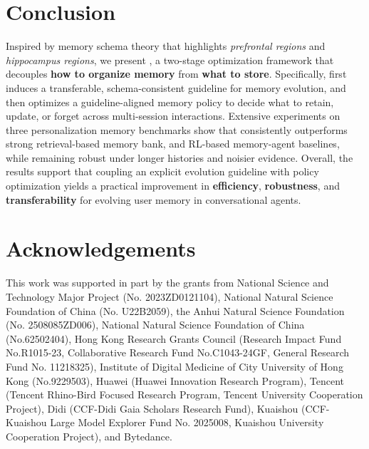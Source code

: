 \section{Conclusion}

Inspired by memory schema theory that highlights \emph{prefrontal regions} and \emph{hippocampus regions}, we present \ourmodel, a two-stage optimization framework that decouples \textbf{how to organize memory} from \textbf{what to store}. Specifically, \ourmodel first induces a transferable, schema-consistent guideline for memory evolution, and then optimizes a guideline-aligned memory policy to decide what to retain, update, or forget across multi-session interactions. Extensive experiments on three personalization memory benchmarks show that \ourmodel consistently outperforms strong retrieval-based memory bank, and RL-based memory-agent baselines, while remaining robust under longer histories and noisier evidence. Overall, the results support that coupling an explicit evolution guideline with policy optimization yields a practical improvement in \textbf{efficiency}, \textbf{robustness}, and \textbf{transferability} for evolving user memory in conversational agents.

\section*{Acknowledgements}
This work was supported in part by the grants from National Science and Technology Major Project (No. 2023ZD0121104), National Natural Science Foundation of China (No. U22B2059), the Anhui Natural Science Foundation (No. 2508085ZD006), National Natural Science Foundation of China (No.62502404), Hong Kong Research Grants Council (Research Impact Fund No.R1015-23, Collaborative Research Fund No.C1043-24GF, General Research Fund No. 11218325), Institute of Digital Medicine of City University of Hong Kong (No.9229503), Huawei (Huawei Innovation Research Program), Tencent (Tencent Rhino-Bird Focused Research Program, Tencent University Cooperation Project), Didi (CCF-Didi Gaia Scholars Research Fund), Kuaishou (CCF-Kuaishou Large Model Explorer Fund No. 2025008, Kuaishou University Cooperation Project), and Bytedance.


